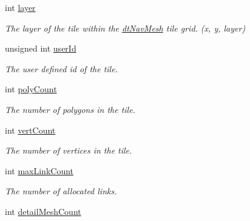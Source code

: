 \begin{DoxyCompactItemize}
\mbox{\label{structdtMeshHeader_ad47558eb925bae065e741742e5c62ea0}} 
int \hyperlink{structdtMeshHeader_ad47558eb925bae065e741742e5c62ea0}{layer}
\begin{DoxyCompactList}\small\item\em The layer of the tile within the \hyperlink{classdtNavMesh}{dt\+Nav\+Mesh} tile grid. (x, y, layer) \end{DoxyCompactList}\item 
\mbox{\label{structdtMeshHeader_a12351c24b7a9fc6456353c22960b6769}} 
unsigned int \hyperlink{structdtMeshHeader_a12351c24b7a9fc6456353c22960b6769}{user\+Id}
\begin{DoxyCompactList}\small\item\em The user defined id of the tile. \end{DoxyCompactList}\item 
\mbox{\label{structdtMeshHeader_ab36d94238505dbf5370c69c8e5276d74}} 
int \hyperlink{structdtMeshHeader_ab36d94238505dbf5370c69c8e5276d74}{poly\+Count}
\begin{DoxyCompactList}\small\item\em The number of polygons in the tile. \end{DoxyCompactList}\item 
\mbox{\label{structdtMeshHeader_aad331f09586b0959eeb0826152315b92}} 
int \hyperlink{structdtMeshHeader_aad331f09586b0959eeb0826152315b92}{vert\+Count}
\begin{DoxyCompactList}\small\item\em The number of vertices in the tile. \end{DoxyCompactList}\item 
\mbox{\label{structdtMeshHeader_ab9f95d40e21c8710f59e78ef89ce1cc0}} 
int \hyperlink{structdtMeshHeader_ab9f95d40e21c8710f59e78ef89ce1cc0}{max\+Link\+Count}
\begin{DoxyCompactList}\small\item\em The number of allocated links. \end{DoxyCompactList}\item 
\mbox{\label{structdtMeshHeader_a79ce7145dd4854c55cd94d5c57faf392}} 
int \hyperlink{structdtMeshHeader_a79ce7145dd4854c55cd94d5c57faf392}{detail\+Mesh\+Count}

\end{DoxyCompactItemize}
